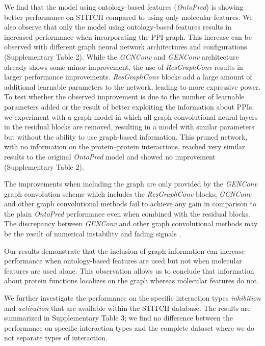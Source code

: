 \documentclass{bioinfo}
\renewcommand{\cite}{\citep}
\begin{document}
We find that the model using ontology-based features
(\textit{OntoPred}) is showing better performance on STITCH compared
to using only molecular features. We also observe that only the model
using ontology-based features results in increased performance when
incorporating the PPI graph. This increase can be observed with
different graph neural network architectures and configurations
(Supplementary Table 2). While the {\em
  GCNConv} and {\em GENConv} architecture already shows some minor
improvement, the use of \textit{ResGraphConv} results in larger
performance improvements.  {\em ResGraphConv} blocks add a large
amount of additional learnable parameters to the network, leading to
more expressive power. To test whether the observed improvement is due
to the number of learnable parameters added or the result of better
exploiting the information about PPIs, we experiment with a graph
model in which all graph convolutional neural layers in the residual
blocks are removed, resulting in a model with similar parameters but
without the ability to use graph-based information. This pruned
network, with no information on the protein--protein interactions,
reached very similar results to the original \textit{OntoPred} model
and showed no improvement (Supplementary Table 2).

The improvements when including the graph are only provided by the
\textit{GENConv} graph convolution scheme which includes the
{\em ResGraphConv} blocks; \textit{GCNConv} and other graph
convolutional methods fail to achieve any gain in comparison to the
plain \textit{OntoPred} performance even when combined with the
residual blocks. The discrepancy between {\em GENConv} and other graph
convolutional methods may be the result of numerical instability and
fading signals \cite{GENConv2020}.

Our results demonstrate that the inclusion of graph information
can increase performance when ontology-based features are used but not
when molecular features are used alone. This observation allows us to
conclude that information about protein functions localizes on the
graph whereas molecular features do not.

We further investigate the performance on the specific interaction
types {\em inhibition} and {\em activation} that are available within
the STITCH database. The results are summarized in Supplementary Table
3; we find no difference between the performance on specific
interaction types and  the complete dataset where we do not separate
types of interaction.
\end{document}
